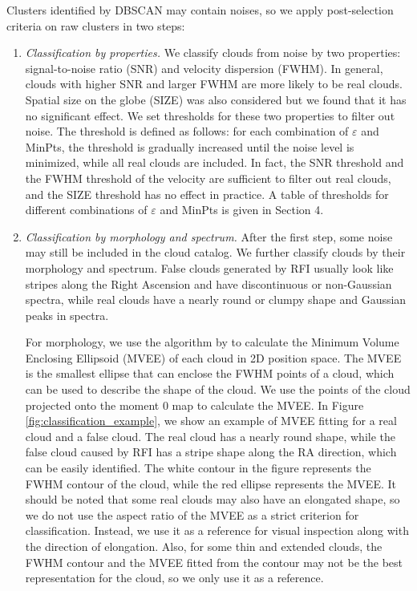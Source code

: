 \documentclass[twocolumn,trackchanges]{aastex701}
\begin{document}
Clusters identiﬁed by DBSCAN may contain noises, so we apply post-selection criteria on raw clusters in two steps:

\begin{enumerate}
    \item \textit{Classification by properties.} We classify clouds from noise by two properties: signal-to-noise ratio (SNR) and velocity dispersion (FWHM). In general, clouds with higher SNR and larger FWHM are more likely to be real clouds. Spatial size on the globe (SIZE) was also considered but we found that it has no significant effect. We set thresholds for these two properties to filter out noise. The threshold is defined as follows: for each combination of $\varepsilon$ and MinPts, the threshold is gradually increased until the noise level is minimized, while all real clouds are included. In fact, the SNR threshold and the FWHM threshold of the velocity are sufficient to filter out real clouds, and the SIZE threshold has no effect in practice. A table of thresholds for different combinations of $\varepsilon$ and MinPts is given in Section 4.
    \item \textit{Classification by morphology and spectrum.} After the first step, some noise may still be included in the cloud catalog. We further classify clouds by their morphology and spectrum. False clouds generated by RFI usually look like stripes along the Right Ascension and have discontinuous or non-Gaussian spectra, while real clouds have a nearly round or clumpy shape and Gaussian peaks in spectra.

    For morphology, we use the algorithm by \citet{khachiyan1996rounding} to calculate the Minimum Volume Enclosing Ellipsoid (MVEE) of each cloud in 2D position space. The MVEE is the smallest ellipse that can enclose the FWHM points of a cloud, which can be used to describe the shape of the cloud. We use the points of the cloud projected onto the moment 0 map to calculate the MVEE. In Figure \ref{fig:classification_example}, we show an example of MVEE fitting for a real cloud and a false cloud. The real cloud has a nearly round shape, while the false cloud caused by RFI has a stripe shape along the RA direction, which can be easily identified. The white contour in the figure represents the FWHM contour of the cloud, while the red ellipse represents the MVEE. It should be noted that some real clouds may also have an elongated shape, so we do not use the aspect ratio of the MVEE as a strict criterion for classification. Instead, we use it as a reference for visual inspection along with the direction of elongation. Also, for some thin and extended clouds, the FWHM contour and the MVEE fitted from the contour may not be the best representation for the cloud, so we only use it as a reference.


\end{enumerate}
\end{document}
